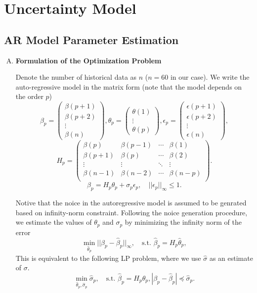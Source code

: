 
\section{\textbf{Uncertainty Model}}

\subsection{AR Model Parameter Estimation}

\begin{enumerate}[A)]

\item \textbf{Formulation of the Optimization Problem}

    Denote the number of historical data as $n$ ($n=60$ in our case). We write the auto-regressive model in the matrix form (note that the model depends on the order $p$)
	\[
	\beta_p = \begin{pmatrix} 
		\beta(p+1)  \\
		\beta(p+2)  \\
		\vdots \\
		\beta(n) 
	\end{pmatrix},
	\theta_p = \begin{pmatrix} 
		\theta(1)  \\
		\vdots \\
		\theta(p) 
	\end{pmatrix},
    \epsilon_p = \begin{pmatrix} 
		\epsilon(p+1)  \\
		\epsilon(p+2)  \\
		\vdots \\
		\epsilon(n) 
	\end{pmatrix},
	\]
    \[
    H_p = \begin{pmatrix} 
        \beta(p)   & \beta(p-1) & \cdots & \beta(1)   \\
        \beta(p+1) & \beta(p)   & \cdots & \beta(2)   \\
        \vdots     & \vdots     & \ddots & \vdots     \\
        \beta(n-1) & \beta(n-2) & \cdots & \beta(n-p) \\
    \end{pmatrix}.
    \]
	\[ 
	\beta_p=H_p\theta_p+\sigma_p\epsilon_p, \quad ||\epsilon_p||_\infty \leq 1.
	\]

	Notive that the noice in the autoregressive model is assumed to be genrated based on infinity-norm constraint. Following the noice generation procedure, we estimate the values of $\theta_p$ and $\sigma_p$ by minimizing the infinity norm of the error
	\[
	\min_{\hat{\theta}_p}||\beta_p-\hat{\beta}_p||_\infty, \quad
    \text{s.t. }\hat{\beta}_p = H_p\hat{\theta}_p,
	\]
	This is equivalent to the following LP problem, where we use $\hat{\sigma}$ as an estimate of $\sigma$.
	\begin{equation}\label{eq:ar_opt} 
	\min_{\hat{\theta}_p, \hat{\sigma}_p}\hat{\sigma}_p, \quad
    \text{s.t. }\hat{\beta}_p=H_p\hat{\theta}_p,|\beta_p-\hat{\beta}_p|\preceq\hat{\sigma}_p.
	\end{equation}


\end{enumerate}
